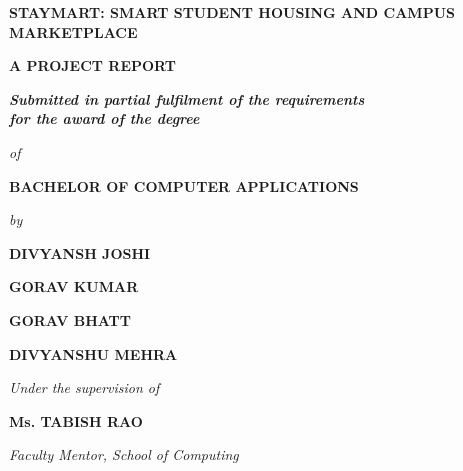 \documentclass[12pt,a4paper]{report}
\begin{document}
\begin{titlepage}
\begin{center}
    \vspace*{0.2cm}
    {\fontsize{16pt}{20pt}\selectfont \textbf{STAYMART: SMART STUDENT HOUSING AND CAMPUS MARKETPLACE}\par}
    
    \vspace{1.0cm}
    {\fontsize{12pt}{14pt}\selectfont \textbf{A PROJECT REPORT}\par}
    
    \vspace{0.6cm}
    {\fontsize{12pt}{14pt}\selectfont \textit{\textbf{Submitted in partial fulfilment of the requirements \\ for the award of the degree}}\par}
    
    \vspace{0.4cm}
    {\fontsize{12pt}{14pt}\selectfont \textit{of}\par}
    
    \vspace{0.4cm}
    {\fontsize{12pt}{14pt}\selectfont \textbf{BACHELOR OF COMPUTER APPLICATIONS}\par}
    
    \vspace{0.8cm}
    {\fontsize{12pt}{14pt}\selectfont \textit{by}\par}
    
    \vspace{0.4cm}
    {\fontsize{12pt}{14pt}\selectfont \textbf{DIVYANSH JOSHI}\par}
    {\fontsize{12pt}{14pt}\selectfont \textbf{GORAV KUMAR}\par}
    {\fontsize{12pt}{14pt}\selectfont \textbf{GORAV BHATT}\par}
    {\fontsize{12pt}{14pt}\selectfont \textbf{DIVYANSHU MEHRA}\par}
    
    \vspace{0.6cm}
    {\fontsize{12pt}{14pt}\selectfont \textit{Under the supervision of}\par}
    
    \vspace{0.4cm}
    {\fontsize{12pt}{14pt}\selectfont \textbf{Ms. TABISH RAO}\par}
    {\fontsize{11pt}{13pt}\selectfont \textit{Faculty Mentor, School of Computing}\par}
    

\end{center}
\end{titlepage}
\end{document}
